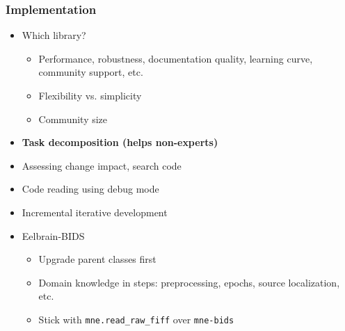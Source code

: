 \documentclass{beamer}
\begin{document}
\begin{frame}

\frametitle{Implementation}

\begin{itemize}

\item Which library?
\begin{itemize}
  \item Performance, robustness, documentation quality, learning curve, community support, etc.
  \item Flexibility vs. simplicity
  \item Community size
\end{itemize}
\item \textbf{Task decomposition (helps non-experts)}
\item Assessing change impact, search code
\item Code reading using debug mode
\item Incremental iterative development
\item Eelbrain-BIDS
\begin{itemize}
  \item Upgrade parent classes first
  \item Domain knowledge in steps: preprocessing, epochs, source localization, etc.
  \item Stick with \texttt{mne.read\_raw\_fiff} over \texttt{mne-bids}
\end{itemize}


\end{itemize}

\end{frame}
\end{document}
